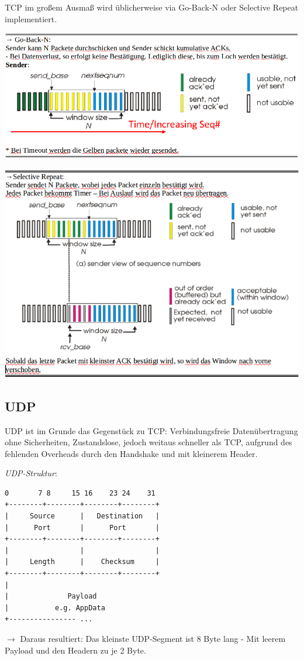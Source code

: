 \documentclass{article}
\begin{document}
    TCP im großem Ausmaß wird üblicherweise via Go-Back-N oder Selective Repeat implementiert.
    \begin{center}
        \includegraphics[width=\textwidth]{GoBackN.png}
    \end{center}
    \begin{center}
        \includegraphics[width=\textwidth]{SelectiveRepeat.png}
    \end{center}

    \subsection{UDP}
    UDP ist im Grunde das Gegenstück zu TCP: Verbindungsfreie Datenübertragung ohne Sicherheiten, Zustandslose, jedoch weitaus schneller als TCP, aufgrund des fehlenden Overheads durch den Handshake und mit kleinerem Header.
    
    \textit{UDP-Struktur}:
    \begin{verbatim}
0       7 8     15 16    23 24    31  
+--------+--------+--------+--------+ 
|     Source      |   Destination   | 
|      Port       |      Port       | 
+--------+--------+--------+--------+ 
|                 |                 | 
|     Length      |    Checksum     | 
+--------+--------+--------+--------+ 
|                                     
|              Payload 
|           e.g. AppData
+---------------- ...                 
    \end{verbatim}
    $\rightarrow$ Daraus resultiert: Das kleinste UDP-Segment ist 8 Byte lang - Mit leerem Payload und den Headern zu je 2 Byte.
    
\end{document}
